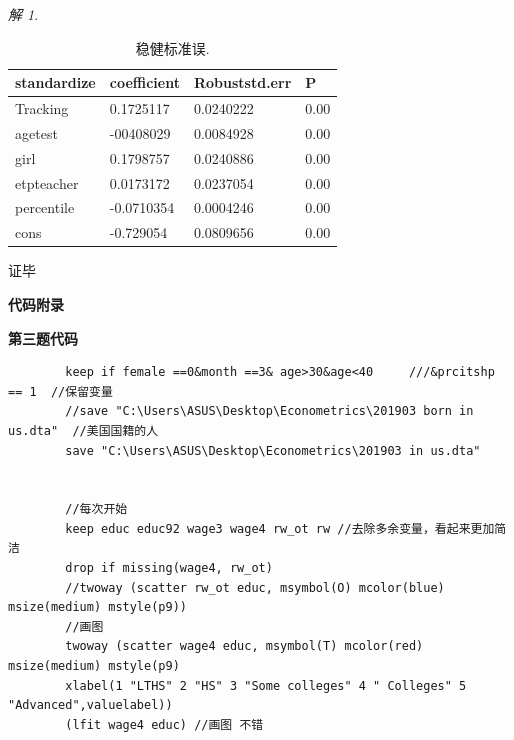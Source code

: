 \documentclass[a4paper]{ctexart}
\theoremstyle{remark}
\newtheorem*{solution}{解}
\renewcommand{\qedsymbol}{证毕}
\begin{document}
\begin{itemize}
\begin{solution}
    \begin{table}[h]
        \centering
        \begin{threeparttable}%
            \begin{tabular}{llll}%
                \hline
                standardize & coefficient & Robuststd.err & P \\
                \hline
                Tracking &  0.1725117 & 0.0240222  & 0.00 \\
                agetest  &   -00408029 & 0.0084928   & 0.00\\
                girl   &  0.1798757 & 0.0240886  & 0.00\\
                etpteacher   &  0.0173172 & 0.0237054    & 0.00\\
                percentile  &  -0.0710354 & 0.0004246   & 0.00\\
                cons  &  -0.729054  & 0.0809656   & 0.00\\
                \hline
            \end{tabular} 
        \end{threeparttable}
        \caption{\label{font-table} 稳健标准误. }
    \end{table}



    \qedsymbol


\end{solution}

\clearpage
{\fontsize{14pt}{16pt}\selectfont \textbf{代码附录}}

{\fontsize{8pt}{12pt}\selectfont \textbf{第三题代码}}
\lstset{language=Python,basicstyle=\ttfamily\small}
    \begin{lstlisting}
        keep if female ==0&month ==3& age>30&age<40     ///&prcitshp == 1  //保留变量
        //save "C:\Users\ASUS\Desktop\Econometrics\201903 born in us.dta"  //美国国籍的人
        save "C:\Users\ASUS\Desktop\Econometrics\201903 in us.dta"


        //每次开始
        keep educ educ92 wage3 wage4 rw_ot rw //去除多余变量，看起来更加简洁    
        drop if missing(wage4, rw_ot)
        //twoway (scatter rw_ot educ, msymbol(O) mcolor(blue) msize(medium) mstyle(p9)) 
        //画图
        twoway (scatter wage4 educ, msymbol(T) mcolor(red) msize(medium) mstyle(p9)
        xlabel(1 "LTHS" 2 "HS" 3 "Some colleges" 4 " Colleges" 5 "Advanced",valuelabel))
        (lfit wage4 educ) //画图 不错



\end{lstlisting}
\end{itemize}
\end{document}
